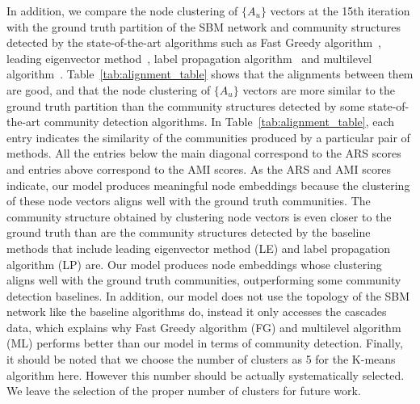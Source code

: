 In addition, we compare the node clustering of $\{A_u\}$ vectors at the 15th iteration with the ground truth partition of the SBM network and community structures detected by the state-of-the-art algorithms such as Fast Greedy algorithm~\cite{clauset2009power}, leading eigenvector method~\cite{newman2006finding}, label propagation algorithm~\cite{raghavan2007near} and multilevel algorithm~\cite{blondel2008fast}. Table~\ref{tab:alignment_table} shows that the alignments between them are good, and that the node clustering of $\{A_u\}$ vectors are more similar to the ground truth partition than the community structures detected by some state-of-the-art community detection algorithms. In Table~\ref{tab:alignment_table}, each entry indicates the similarity of the communities produced by a particular pair of methods. All the entries below the main diagonal correspond to the ARS scores and entries above correspond to the AMI scores. As the ARS and AMI scores indicate, our model produces meaningful node embeddings because the clustering of these node vectors aligns well with the ground truth communities. The community structure obtained by clustering node vectors is even closer to the ground truth than are the community structures detected by the baseline methods that include leading eigenvector method (LE) and label propagation algorithm (LP) are. Our model produces node embeddings whose clustering aligns well with the ground truth communities, outperforming some community detection baselines. In addition, our model does not use the topology of the SBM network like the baseline algorithms do, instead it only accesses the cascades data, which explains why Fast Greedy algorithm (FG) and multilevel algorithm (ML) performs better than our model in terms of community detection. Finally, it should be noted that we choose the number of clusters as 5 for the K-means algorithm here. However this number should be actually systematically selected. We leave the selection of the proper number of clusters for future work.

